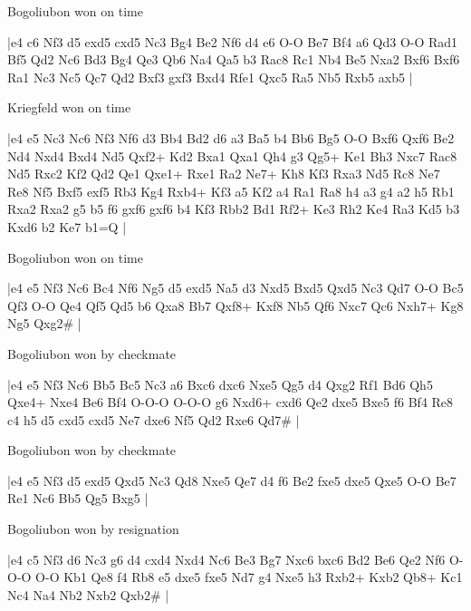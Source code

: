 \showboard

Bogoliubon won on time

\makegametitle
|e4 c6 Nf3 d5 exd5 cxd5 Nc3 Bg4 Be2 Nf6 d4 e6 O-O Be7 Bf4 a6 Qd3 O-O Rad1 Bf5 Qd2 Nc6 Bd3 Bg4 Qe3 Qb6 Na4 Qa5 b3 Rac8 Rc1 Nb4 Be5 Nxa2 Bxf6 Bxf6 Ra1 Nc3 Nc5 Qc7 Qd2 Bxf3 gxf3 Bxd4 Rfe1 Qxc5 Ra5 Nb5 Rxb5 axb5  |

\showboard

Kriegfeld won on time

\makegametitle
|e4 e5 Nc3 Nc6 Nf3 Nf6 d3 Bb4 Bd2 d6 a3 Ba5 b4 Bb6 Bg5 O-O Bxf6 Qxf6 Be2 Nd4 Nxd4 Bxd4 Nd5 Qxf2+ Kd2 Bxa1 Qxa1 Qh4 g3 Qg5+ Ke1 Bh3 Nxc7 Rac8 Nd5 Rxc2 Kf2 Qd2 Qe1 Qxe1+ Rxe1 Ra2 Ne7+ Kh8 Kf3 Rxa3 Nd5 Rc8 Ne7 Re8 Nf5 Bxf5 exf5 Rb3 Kg4 Rxb4+ Kf3 a5 Kf2 a4 Ra1 Ra8 h4 a3 g4 a2 h5 Rb1 Rxa2 Rxa2 g5 b5 f6 gxf6 gxf6 b4 Kf3 Rbb2 Bd1 Rf2+ Ke3 Rh2 Ke4 Ra3 Kd5 b3 Kxd6 b2 Ke7 b1=Q  |

\showboard

Bogoliubon won on time

\makegametitle
|e4 e5 Nf3 Nc6 Bc4 Nf6 Ng5 d5 exd5 Na5 d3 Nxd5 Bxd5 Qxd5 Nc3 Qd7 O-O Bc5 Qf3 O-O Qe4 Qf5 Qd5 b6 Qxa8 Bb7 Qxf8+ Kxf8 Nb5 Qf6 Nxc7 Qc6 Nxh7+ Kg8 Ng5 Qxg2\#  |

\showboard

Bogoliubon won by checkmate

\makegametitle
|e4 e5 Nf3 Nc6 Bb5 Bc5 Nc3 a6 Bxc6 dxc6 Nxe5 Qg5 d4 Qxg2 Rf1 Bd6 Qh5 Qxe4+ Nxe4 Be6 Bf4 O-O-O O-O-O g6 Nxd6+ cxd6 Qe2 dxe5 Bxe5 f6 Bf4 Re8 c4 h5 d5 cxd5 cxd5 Ne7 dxe6 Nf5 Qd2 Rxe6 Qd7\#  |

\showboard

Bogoliubon won by checkmate

\makegametitle
|e4 e5 Nf3 d5 exd5 Qxd5 Nc3 Qd8 Nxe5 Qe7 d4 f6 Be2 fxe5 dxe5 Qxe5 O-O Be7 Re1 Nc6 Bb5 Qg5 Bxg5  |

\showboard

Bogoliubon won by resignation

\makegametitle
|e4 c5 Nf3 d6 Nc3 g6 d4 cxd4 Nxd4 Nc6 Be3 Bg7 Nxc6 bxc6 Bd2 Be6 Qe2 Nf6 O-O-O O-O Kb1 Qe8 f4 Rb8 e5 dxe5 fxe5 Nd7 g4 Nxe5 h3 Rxb2+ Kxb2 Qb8+ Kc1 Nc4 Na4 Nb2 Nxb2 Qxb2\#  |

